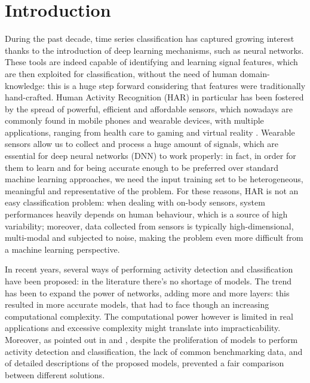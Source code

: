 
\section{Introduction}
\label{sec:introduction}

During the past decade, time series classification has captured growing interest thanks to the introduction of deep learning mechanisms, such as neural networks. These tools are indeed capable of identifying and learning signal features, which are then exploited for classification, without the need of human domain-knowledge: this is a huge step forward considering that features were traditionally hand-crafted.
Human Activity Recognition (HAR) in particular has been fostered by the spread of powerful, efficient and affordable sensors, which nowadays are commonly found in mobile phones and wearable devices, with multiple applications, ranging from health care to gaming and virtual reality \cite{HAR-2013}.
Wearable sensors allow us to collect and process a huge amount of signals, which are essential for deep neural networks (DNN) to work properly: in fact, in order for them to learn and for being accurate enough to be preferred over standard machine learning approaches, we need the input training set to be heterogeneous, meaningful and representative of the problem.
For these reasons, HAR is not an easy classification problem: when dealing with on-body sensors, system performances heavily depends on human behaviour, which is a source of high variability; moreover, data collected from sensors is typically high-dimensional, multi-modal and subjected to noise, making the problem even more difficult from a machine learning perspective. 

In recent years, several ways of performing activity detection and classification have been proposed: in the literature there's no shortage of models.
The trend has been to expand the power of networks, adding more and more layers: this resulted in more accurate models, that had to face though an increasing computational complexity. The computational power however is limited in real applications and excessive complexity might translate into impracticability. Moreover, as pointed out in \cite{Chavarriaga2013} and \cite{HAR-COMP2018}, despite the proliferation of models to perform activity detection and classification, the lack of common benchmarking data, and of detailed descriptions of the proposed models, prevented a fair comparison between different solutions.

